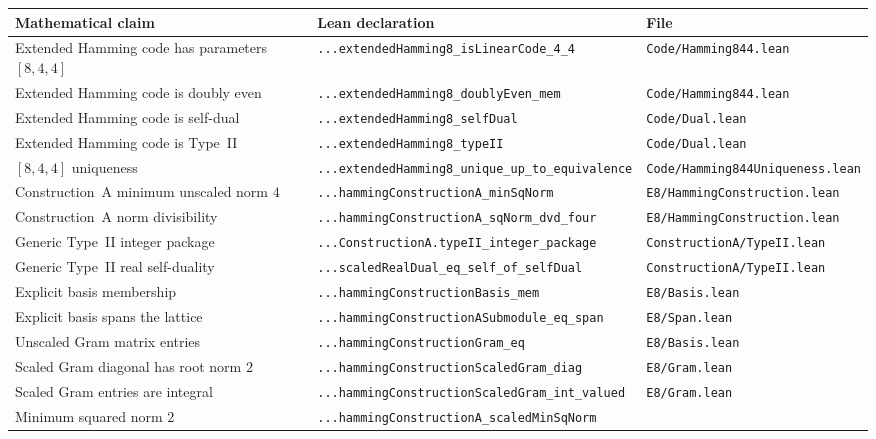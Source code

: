 \documentclass[12pt]{article}
\theoremstyle{definition}
\newcommand{\lean}[1]{\texttt{#1}}
\begin{document}
\begin{longtable}{@{}p{5.3cm}p{5.4cm}p{3.5cm}@{}}
\toprule
\textbf{Mathematical claim} &
\textbf{Lean declaration} &
\textbf{File} \\
\midrule
\endhead
\bottomrule
\endfoot
Extended Hamming code has parameters $[8,4,4]$ &
  \lean{...extendedHamming8\_isLinearCode\_4\_4} &
  \lean{Code/Hamming844.lean} \\[2pt]
Extended Hamming code is doubly even &
  \lean{...extendedHamming8\_doublyEven\_mem} &
  \lean{Code/Hamming844.lean} \\[2pt]
Extended Hamming code is self-dual &
  \lean{...extendedHamming8\_selfDual} &
  \lean{Code/Dual.lean} \\[2pt]
Extended Hamming code is Type~II &
  \lean{...extendedHamming8\_typeII} &
  \lean{Code/Dual.lean} \\[2pt]
$[8,4,4]$ uniqueness &
  \lean{...extendedHamming8\_unique\_up\_to\_equivalence} &
  \lean{Code/Hamming844Uniqueness.lean} \\[2pt]
Construction~A minimum unscaled norm $4$ &
  \lean{...hammingConstructionA\_minSqNorm} &
  \lean{E8/HammingConstruction.lean} \\[2pt]
Construction~A norm divisibility &
  \lean{...hammingConstructionA\_sqNorm\_dvd\_four} &
  \lean{E8/HammingConstruction.lean} \\[2pt]
Generic Type~II integer package &
  \lean{...ConstructionA.typeII\_integer\_package} &
  \lean{ConstructionA/TypeII.lean} \\[2pt]
Generic Type~II real self-duality &
  \lean{...scaledRealDual\_eq\_self\_of\_selfDual} &
  \lean{ConstructionA/TypeII.lean} \\[2pt]
Explicit basis membership &
  \lean{...hammingConstructionBasis\_mem} &
  \lean{E8/Basis.lean} \\[2pt]
Explicit basis spans the lattice &
  \lean{...hammingConstructionASubmodule\_eq\_span} &
  \lean{E8/Span.lean} \\[2pt]
Unscaled Gram matrix entries &
  \lean{...hammingConstructionGram\_eq} &
  \lean{E8/Basis.lean} \\[2pt]
Scaled Gram diagonal has root norm $2$ &
  \lean{...hammingConstructionScaledGram\_diag} &
  \lean{E8/Gram.lean} \\[2pt]
Scaled Gram entries are integral &
  \lean{...hammingConstructionScaledGram\_int\_valued} &
  \lean{E8/Gram.lean} \\[2pt]
Minimum squared norm $2$ &
  \lean{...hammingConstructionA\_scaledMinSqNorm} &

\end{longtable}
\end{document}
